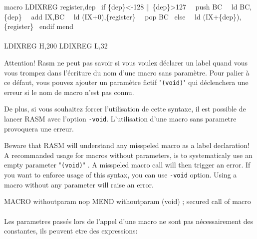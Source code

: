 \begin{code}
macro LDIXREG register,dep
\ if \{dep\}\textless-128 || \{dep\}\textgreater127
\ \ push BC
\ \ ld BC,\{dep\}
\ \ add IX,BC
\ \ ld (IX+0),\{register\}
\ \ pop BC
\ else
\ \ ld (IX+\{dep\}),\{register\}
\ endif
mend
\end{code}

\paragraph{}

\begin{code}
LDIXREG H,200
LDIXREG L,32
\end{code}

\begin{xfr}
Attention! Rasm ne peut pas savoir si vous voulez déclarer un label quand vous vous trompez dans l'écriture du nom d'une macro sans paramètre.
Pour palier à ce défaut, vous pouvez ajouter un paramètre fictif "\texttt{(void)}"  qui déclenchera une erreur si le nom de macro n'est pas connu.

De plus, si vous souhaitez forcer l'utilisation de cette syntaxe, il est possible de lancer RASM avec l'option \texttt{-void}.
L'utilisation d'une macro sans parametre provoquera une erreur.
\end{xfr}

\begin{xen}
Beware that RASM will understand any misspeled macro as a label declaration!
A recommanded usage for macros without parameters, is to systematicaly use an empty parameter "\texttt{(void)}" .
A misspeled macro call will then trigger an error.
If you want to enforce usage of this syntax, you can use \texttt{-void} option. Using a macro without any parameter will raise an error.

\end{xen}

\begin{code}
MACRO withoutparam
nop
MEND
withoutparam (void) ; secured call of macro
\end{code}

\paragraph{}

\begin{xfr}
Les parametres passés lors de l'appel d'une macro ne sont pas nécessairement des constantes, ils peuvent etre des expressions:
\end{xfr}

